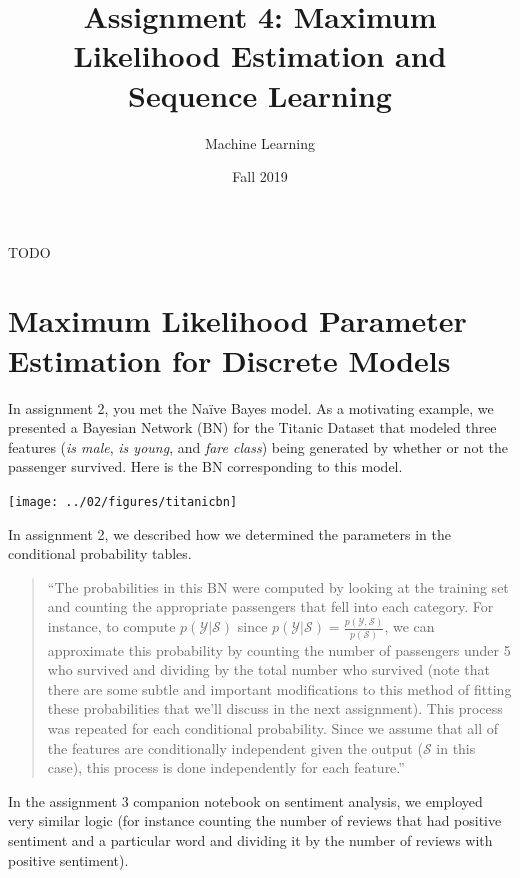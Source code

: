 \documentclass[assignment04_Solutions]{subfiles}
\title{Assignment 4: Maximum Likelihood Estimation and Sequence Learning}
\author{Machine Learning}
\date{Fall 2019}
\begin{document}
\maketitle
\thispagestyle{firstpage}


\begin{learningobjectives}
\bi
\item TODO
\ei
\end{learningobjectives}


\section{Maximum Likelihood Parameter Estimation for Discrete Models}
In assignment 2, you met the Na\"ive Bayes model.  As a motivating example, we presented a Bayesian Network (BN) for the Titanic Dataset that modeled three features (\emph{is male}, \emph{is young}, and \emph{fare class}) being generated by whether or not the passenger survived.  Here is the BN corresponding to this model.

\begin{center}
\texttt{[image: ../02/figures/titanicbn]}
\end{center}

In assignment 2, we described how we determined the parameters in the conditional probability tables.
\begin{quote}
``The probabilities in this BN were computed by looking at the training set and counting the appropriate passengers that fell into each category.  For instance, to compute $p(\mathcal{Y}|\mathcal{S})$ since $p(\mathcal{Y}|\mathcal{S}) = \frac{p(\mathcal{Y}, \mathcal{S})}{p(\mathcal{S})}$, we can approximate this probability by counting the number of passengers under 5 who survived and dividing by the total number who survived (note that there are some subtle and important modifications to this method of fitting these probabilities that we'll discuss in the next assignment).  This process was repeated for each conditional probability.  Since we assume that all of the features are conditionally independent given the output ($\mathcal{S}$ in this case), this process is done independently for each feature.''
\end{quote}

In the assignment 3 companion notebook on sentiment analysis, we employed very similar logic (for instance counting the number of reviews that had positive sentiment and a particular word and dividing it by the number of reviews with positive sentiment).
\end{document}
